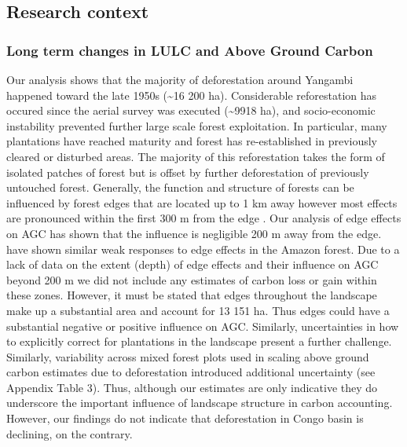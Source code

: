 \documentclass[remote sensing,article,submit,moreauthors,pdftex]{mdpi}
\begin{document}
\hypertarget{research-context}{%
\subsection{Research context}\label{research-context}}

\hypertarget{long-term-changes-in-lulc-and-above-ground-carbon-1}{%
\subsubsection{Long term changes in LULC and Above Ground
Carbon}\label{long-term-changes-in-lulc-and-above-ground-carbon-1}}

Our analysis shows that the majority of deforestation around Yangambi
happened toward the late 1950s (\textasciitilde{}16 200 ha).
Considerable reforestation has occured since the aerial survey was
executed (\textasciitilde{}9918 ha), and socio-economic instability
prevented further large scale forest exploitation. In particular, many
plantations have reached maturity and forest has re-established in
previously cleared or disturbed areas. The majority of this
reforestation takes the form of isolated patches of forest but is offset
by further deforestation of previously untouched forest. Generally, the
function and structure of forests can be influenced by forest edges that
are located up to 1 km away however most effects are pronounced within
the first 300 m from the edge \citep{gascon2000}. Our analysis of edge
effects on AGC has shown that the influence is negligible 200 m away
from the edge. \citet{phillips2006} have shown similar weak responses to
edge effects in the Amazon forest. Due to a lack of data on the extent
(depth) of edge effects and their influence on AGC beyond 200 m we did
not include any estimates of carbon loss or gain within these zones.
However, it must be stated that edges throughout the landscape make up a
substantial area and account for 13 151 ha. Thus edges could have a
substantial negative \citep{brinck2017} or positive \citep{reinmann2017}
influence on AGC. Similarly, uncertainties in how to explicitly correct
for plantations in the landscape present a further challenge. Similarly,
variability across mixed forest plots used in scaling above ground
carbon estimates due to deforestation introduced additional uncertainty
(see Appendix Table 3). Thus, although our estimates are only indicative
they do underscore the important influence of landscape structure in
carbon accounting. However, our findings do not indicate that
deforestation in Congo basin is declining, on the contrary.
\end{document}
